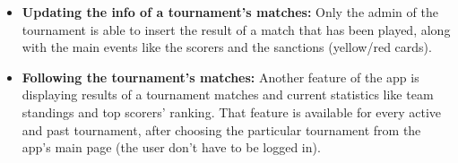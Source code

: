 \begin{itemize}
    \item \textbf{Updating the info of a tournament's matches:}
        Only the admin of the tournament is able to insert the result of a match that has been played, along with the main events like the scorers and the sanctions (yellow/red cards).

    \item \textbf{Following the tournament's matches:}
        Another feature of the app is displaying results of a tournament matches and current statistics like team standings and top scorers' ranking. That feature is available for every active and past tournament, after choosing the particular tournament from the app's main page (the user don't have to be logged in).

\end{itemize}
\newpage